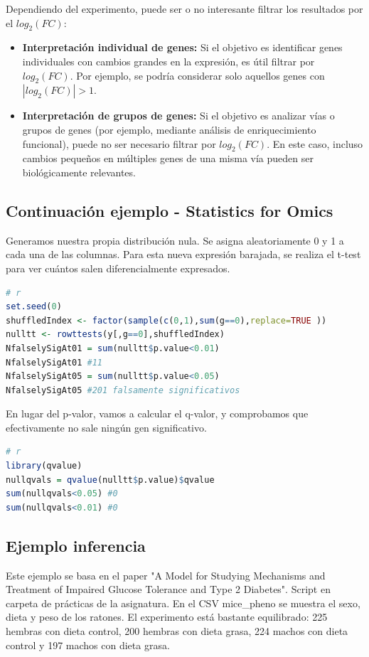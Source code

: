 Dependiendo del experimento, puede ser o no interesante filtrar los resultados por el $log_2(FC)$:
\begin{itemize}
\item \textbf{Interpretación individual de genes:} Si el objetivo es identificar genes individuales con cambios grandes en la expresión, es útil filtrar por $log_2(FC)$. Por ejemplo, se podría considerar solo aquellos genes con $|log_2(FC)| > 1$.
\item \textbf{Interpretación de grupos de genes:} Si el objetivo es analizar vías o grupos de genes (por ejemplo, mediante análisis de enriquecimiento funcional), puede no ser necesario filtrar por $log_2(FC)$. En este caso, incluso cambios pequeños en múltiples genes de una misma vía pueden ser biológicamente relevantes.
\end{itemize}

\subsection{Continuación ejemplo - Statistics for Omics}
Generamos nuestra propia distribución nula. Se asigna aleatoriamente 0 y 1 a cada una de las columnas.  Para esta nueva expresión barajada, se realiza el t-test para ver cuántos salen diferencialmente expresados.
\begin{lstlisting}[language=R]
# r
set.seed(0)
shuffledIndex <- factor(sample(c(0,1),sum(g==0),replace=TRUE ))
nulltt <- rowttests(y[,g==0],shuffledIndex)
NfalselySigAt01 = sum(nulltt$p.value<0.01)
NfalselySigAt01 #11
NfalselySigAt05 = sum(nulltt$p.value<0.05)
NfalselySigAt05 #201 falsamente significativos
\end{lstlisting}

En lugar del p-valor, vamos a calcular el q-valor, y comprobamos que efectivamente no sale ningún gen significativo.
\begin{lstlisting}[language=R]
# r
library(qvalue)
nullqvals = qvalue(nulltt$p.value)$qvalue
sum(nullqvals<0.05) #0
sum(nullqvals<0.01) #0
\end{lstlisting}

\subsection{Ejemplo inferencia}
Este ejemplo se basa en el paper "A Model for Studying Mechanisms and Treatment of Impaired Glucose Tolerance and Type 2 Diabetes". Script en carpeta de prácticas de la asignatura.
En el CSV mice\_pheno se muestra el sexo, dieta y peso de los ratones. El experimento está bastante equilibrado: 225 hembras con dieta control, 200 hembras con dieta grasa, 224 machos con dieta control y 197 machos con dieta grasa.

